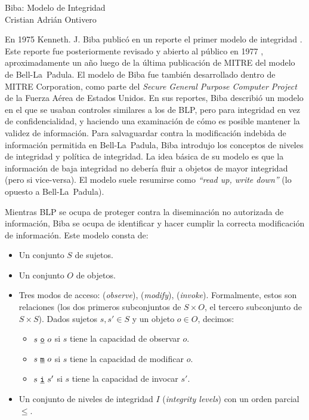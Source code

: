 \documentclass[spanish]{article}
\theoremstyle{definition}
\begin{document}
\begin{center}
  {\LARGE Biba: Modelo de Integridad}\\[.2cm]
  Cristian Adrián Ontivero \\[.05cm]%
  \isodate
\end{center}


\vspace{0.2 cm}

En 1975 Kenneth. J. Biba publicó en un reporte el primer modelo de integridad
\cite{Biba75}.  Este reporte fue posteriormente revisado y abierto al público en
1977 \cite{Biba77}, aproximadamente un año luego de la última publicación de
MITRE del modelo de Bell-La~Padula. El modelo de Biba fue también desarrollado
dentro de MITRE Corporation, como parte del \textit{Secure General Purpose
Computer Project} de la Fuerza Aérea de Estados Unidos. En sus reportes, Biba
describió un modelo en el que se usaban controles similares a los de BLP, pero
para integridad en vez de confidencialidad, y haciendo una examinación de cómo es
posible mantener la validez de información.  Para salvaguardar contra la
modificación indebida de información permitida en Bell-La~Padula, Biba introdujo
los conceptos de niveles de integridad y política de integridad. La idea básica
de su modelo es que la información de baja integridad no debería fluir a objetos
de mayor integridad (pero si vice-versa). El modelo suele resumirse como
\textit{``read up, write down''} (lo opuesto a Bell-La~Padula).


Mientras BLP se ocupa de proteger contra la diseminación no autorizada de
información, Biba se ocupa de identificar y hacer cumplir la correcta
modificación de información. Este modelo consta de:
\begin{itemize}
\itemsep0em 
  \item Un conjunto $S$ de sujetos.
  \item Un conjunto $O$ de objetos.
  \item Tres modos de acceso:  (\textit{observe}), 
    (\textit{modify}),  (\textit{invoke}). Formalmente, estos son
    relaciones (los dos primeros subconjuntos de $S \times O$, el tercero
    subconjunto de $S \times S$). Dados sujetos $s,s' \in S$ y un objeto $o \in
    O$, decimos:
    
  \begin{itemize}
    \item $s~\underline{\texttt{o}}~o$ si $s$ tiene la capacidad de observar $o$.
    \item $s~\underline{\texttt{m}}~o$ si $s$ tiene la capacidad de modificar $o$.
    \item $s~\underline{\texttt{i}}~s'$ si $s$ tiene la capacidad de invocar $s'$.
  \end{itemize}
   
  \item Un conjunto de niveles de integridad $I$ (\textit{integrity levels}) con un orden parcial $\leq$.
\end{itemize}
\end{document}
